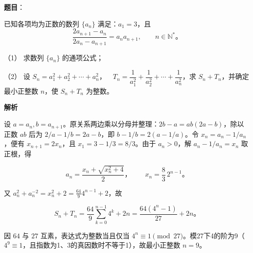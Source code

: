 \begin{answer}

\textbf{题目}：

已知各项均为正数的数列 $\{a_n\}$ 满足：$a_1=3$，且
\nopagebreak[4]
\[
\frac{2a_{n+1}-a_n}{2a_n-a_{n+1}}=a_na_{n+1},\qquad n\in\mathbb N^*\mbox{。}
\]

（1） 求数列 $\{a_n\}$ 的通项公式；

（2） 设 $S_n=a_1^2+a_2^2+\cdots+a_n^2\text{，}\quad T_n=\dfrac1{a_1^2}+\dfrac1{a_2^2}+\cdots+\dfrac1{a_n^2}$，求 $S_n+T_n$，并确定最小正整数 $n$，使 $S_n+T_n$ 为整数。

\textbf{解析}


设 $a=a_n,b=a_{n+1}$。原关系两边乘以分母并整理：$2b-a=ab(2a-b)$，除以正数 $ab$ 后为 $2/a-1/b=2a-b$，即 $b-1/b=2(a-1/a)$。令 $x_n=a_n-1/a_n$，便有 $x_{n+1}=2x_n$，且 $x_1=3-1/3=8/3$。由于 $a_n>0$，解 $a_n-1/a_n=x_n$ 取正根，得

\nopagebreak[4]
\[a_n=\frac{x_n+\sqrt{x_n^2+4}}2\text{，}\qquad x_n=\frac83\,2^{n-1}\mbox{。}\]


又 $a_n^2+a_n^{-2}=x_n^2+2=\frac{64}{9}4^{n-1}+2$，故

\nopagebreak[4]
\[S_n+T_n=\frac{64}{9}\sum_{k=0}^{n-1}4^k+2n=\frac{64(4^n-1)}{27}+2n\mbox{。}\]

因 $64$ 与 $27$ 互素，表达式为整数当且仅当 $4^n\equiv1\pmod{27}$。模27下4的阶为9（$4^9\equiv1$，且指数为1、3的真因数时不等于1），故最小正整数 $n=9$。



\end{answer}